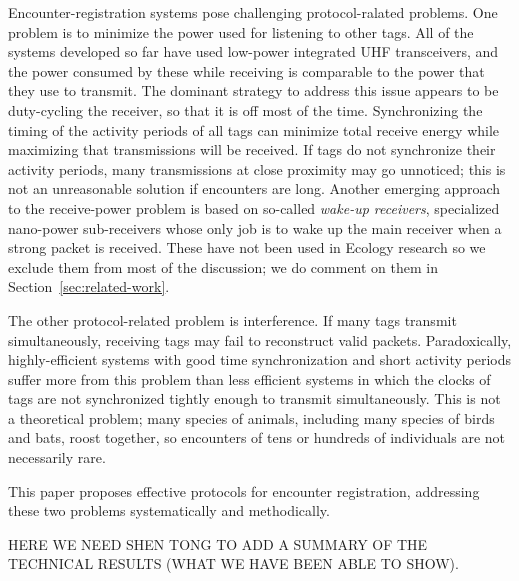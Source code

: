 Encounter-registration systems pose challenging protocol-ralated problems. One problem is to minimize
the power used for listening to other tags. All of the systems developed so far have used low-power integrated
UHF transceivers, and the power consumed by these while receiving is comparable to the power that they use
to transmit. The dominant strategy to address this issue appears to be duty-cycling the receiver, so that it is
off most of the time. Synchronizing the timing of the activity periods of all tags can minimize total receive energy
while maximizing that transmissions will be received. If tags do not synchronize their activity periods, many transmissions
at close proximity may go unnoticed; this is not an unreasonable solution if encounters are long. Another emerging approach
to the receive-power problem is based on so-called {\em wake-up receivers}, specialized nano-power sub-receivers whose only
job is to wake up the main receiver when a strong packet is received. These have not been used in Ecology research so we
exclude them from most of the discussion; we do comment on them in Section~\ref{sec:related-work}.

The other protocol-related problem is interference. If many tags transmit simultaneously, receiving tags may fail
to reconstruct valid packets. Paradoxically, highly-efficient systems with good time synchronization and short activity
periods suffer more from this problem than less efficient systems in which the clocks of tags are not synchronized tightly
enough to transmit simultaneously. This is not a theoretical problem; many species of animals, including many species of
birds and bats, roost together, so encounters of tens or hundreds of individuals are not necessarily rare.

This paper proposes effective protocols for encounter registration, addressing these two problems systematically and
methodically. 

HERE WE NEED SHEN TONG TO ADD A SUMMARY OF THE TECHNICAL RESULTS (WHAT WE HAVE BEEN ABLE TO SHOW).



 


